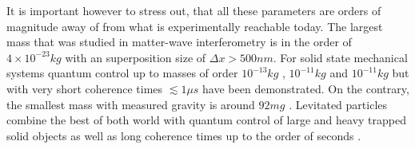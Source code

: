 It is important however to stress out, that all these parameters are orders of magnitude away of from what is experimentally reachable today.
The largest mass that was studied in matter-wave interferometry is in the order of $4\times 10^{-23}\si{kg}$ \cite{Fein_2019} with an superposition size of $\Delta x > 500\si{nm}$.
For solid state mechanical systems quantum control up to masses of order $10^{-13}\si{kg}$ \cite{OConnell_2010}, $10^{-11}\si{kg}$ \cite{Lee_2011} and $10^{-11}\si{kg}$ \cite{Bild_2023} but with very short coherence times $\lesssim 1\si{\mu s}$ have been demonstrated.
On the contrary, the smallest mass with measured gravity is around $92 \si{mg}$ \cite{Westphal_2021}.
Levitated particles combine the best of both world with quantum control of large and heavy trapped solid objects as well as long coherence times up to the order of seconds \cite{Aspelmeyer_2024}.

